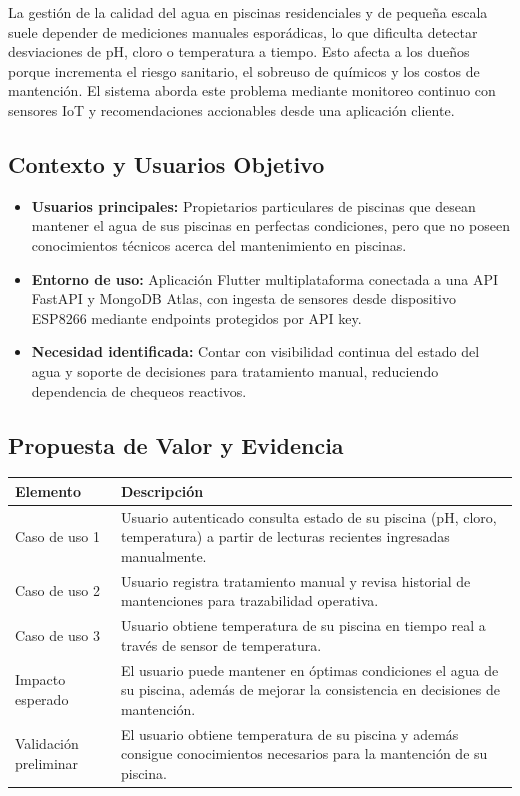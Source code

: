 \documentclass[11pt, a4paper]{article}
\begin{document}
\vspace{0.3em}
La gestión de la calidad del agua en piscinas residenciales y de pequeña escala suele depender de mediciones manuales esporádicas, lo que dificulta detectar desviaciones de pH, cloro o temperatura a tiempo. Esto afecta a los dueños porque incrementa el riesgo sanitario, el sobreuso de químicos y los costos de mantención. El sistema aborda este problema mediante monitoreo continuo con sensores IoT y recomendaciones accionables desde una aplicación cliente.

\subsection{Contexto y Usuarios Objetivo}

\begin{itemize}
  \item \textbf{Usuarios principales:} Propietarios particulares de piscinas que desean mantener el agua de sus piscinas en perfectas condiciones, pero que no poseen conocimientos técnicos acerca del mantenimiento en piscinas.
  \item \textbf{Entorno de uso:} Aplicación Flutter multiplataforma conectada a una API FastAPI y MongoDB Atlas, con ingesta de sensores desde dispositivo ESP8266 mediante endpoints protegidos por API key.
  \item \textbf{Necesidad identificada:} Contar con visibilidad continua del estado del agua y soporte de decisiones para tratamiento manual, reduciendo dependencia de chequeos reactivos.
\end{itemize}

\subsection{Propuesta de Valor y Evidencia}

\begin{tabularx}{\textwidth}{@{} l X @{}}
  \toprule
  \textbf{Elemento}        & \textbf{Descripción} \\
  \midrule
  Caso de uso 1            & Usuario autenticado consulta estado de su piscina (pH, cloro, temperatura) a partir de lecturas recientes ingresadas manualmente. \\
  Caso de uso 2            & Usuario registra tratamiento manual y revisa historial de mantenciones para trazabilidad operativa. \\
  Caso de uso 3            & Usuario obtiene temperatura de su piscina en tiempo real a través de sensor de temperatura. \\
  Impacto esperado         & El usuario puede mantener en óptimas condiciones el agua de su piscina, además de mejorar la consistencia en decisiones de mantención. \\
  Validación preliminar    & El usuario obtiene temperatura de su piscina y además consigue conocimientos necesarios para la mantención de su piscina. \\
  \bottomrule
\end{tabularx}
\end{document}

